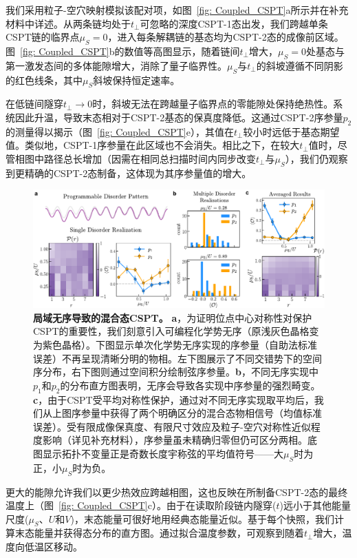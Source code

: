 \documentclass[preprint,superscriptaddress,floatfix, nofootinbib]{revtex4-2}
\begin{document}
\begin{CJK*}{UTF8}{gbsn}
我们采用粒子-空穴映射模拟该配对项，如图~\ref{fig: Coupled_CSPT}a所示并在补充材料中详述。从两条链均处于$t_\perp$可忽略的深度CSPT-1态出发，我们跨越单条CSPT链的临界点$\mu_S=0$，进入每条解耦链的基态均为CSPT-2态的成像前区域。图~\ref{fig: Coupled_CSPT}b的数值等高图显示，随着链间$t_\perp$增大，$\mu_S=0$处基态与第一激发态间的多体能隙增大，消除了量子临界性。$\mu_S$与$t_\perp$的斜坡遵循不同阴影的红色线条，其中$\mu_S$斜坡保持恒定速率。

在低链间隧穿$t_\perp \rightarrow 0$时，斜坡无法在跨越量子临界点的零能隙处保持绝热性。系统因此升温，导致末态相对于CSPT-2基态的保真度降低。这通过CSPT-2序参量$p_2$的测量得以揭示（图~\ref{fig: Coupled_CSPT}e），其值在$t_{\perp}$较小时远低于基态期望值。类似地，CSPT-1序参量在此区域也不会消失。相比之下，在较大$t_\perp$值时，尽管相图中路径总长增加（因需在相同总扫描时间内同步改变$t_\perp$与$\mu_S$），我们仍观察到更精确的CSPT-2态制备，这体现为其序参量值的增大。
\begin{figure}
    \centering
    \includegraphics[width=\textwidth]{figures/CSPT_average.pdf}
    \caption{\textbf{局域无序导致的混合态CSPT。} \textbf{a}，为证明位点中心对称性对保护CSPT的重要性，我们刻意引入可编程化学势无序（原浅灰色晶格变为紫色晶格）。下图显示单次化学势无序实现的序参量（自助法标准误差）不再呈现清晰分明的物相。左下图展示了不同交错势下的空间序分布，右下图则通过空间积分绘制弦序参量。\textbf{b}，不同无序实现中$p_1$和$p_2$的分布直方图表明，无序会导致各实现中序参量的强烈畸变。\textbf{c}，由于CSPT受平均对称性保护，通过对不同无序实现取平均后，我们从上图序参量中获得了两个明确区分的混合态物相信号（均值标准误差）。受有限成像保真度、有限尺寸效应及粒子-空穴对称性近似程度影响（详见补充材料），序参量虽未精确归零但仍可区分两相。底图显示拓扑不变量正是奇数长度宇称弦的平均值符号——大$\mu_S$时为正，小$\mu_S$时为负。}
    \label{fig: CSPT_average}
\end{figure}

更大的能隙允许我们以更少热效应跨越相图，这也反映在所制备CSPT-2态的最终温度上（图~\ref{fig: Coupled_CSPT}c）。由于在读取阶段链内隧穿($t$)远小于其他能量尺度($\mu_S$、$U$和$V$)，末态能量可很好地用经典态能量近似。基于每个快照，我们计算末态能量并获得态分布的直方图。通过拟合温度参数，可观察到随着$t_\perp$增大，温度向低温区移动。


\end{CJK*}
\end{document}
